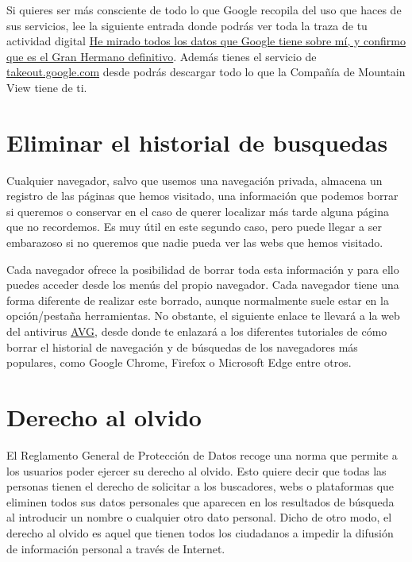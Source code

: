\documentclass[
  a4paper,
  openany]{book}
\begin{document}
Si quieres ser más consciente de todo lo que Google recopila del uso que haces de sus servicios, lee la siguiente entrada donde podrás ver toda la traza de tu actividad digital \href{https://www.xataka.com/privacidad/he-mirado-todos-datos-que-google-tiene-mi-confirmo-que-gran-hermano-definitivo-2}{He mirado todos los datos que Google tiene sobre mí, y confirmo que es el Gran Hermano definitivo}. Además tienes el servicio de \href{https://takeout.google.com}{takeout.google.com} desde podrás descargar todo lo que la Compañía de Mountain View tiene de ti.

\hypertarget{eliminar-el-historial-de-busquedas}{%
\section{Eliminar el historial de busquedas}\label{eliminar-el-historial-de-busquedas}}

Cualquier navegador, salvo que usemos una navegación privada, almacena un registro de las páginas que hemos visitado, una información que podemos borrar si queremos o conservar en el caso de querer localizar más tarde alguna página que no recordemos. Es muy útil en este segundo caso, pero puede llegar a ser embarazoso si no queremos que nadie pueda ver las webs que hemos visitado.

Cada navegador ofrece la posibilidad de borrar toda esta información y para ello puedes acceder desde los menús del propio navegador. Cada navegador tiene una forma diferente de realizar este borrado, aunque normalmente suele estar en la opción/pestaña herramientas. No obstante, el siguiente enlace te llevará a la web del antivirus \href{https://www.avg.com/es/signal/how-to-clear-your-browsing-and-search-history}{AVG}, desde donde te enlazará a los diferentes tutoriales de cómo borrar el historial de navegación y de búsquedas de los navegadores más populares, como Google Chrome, Firefox o Microsoft Edge entre otros.

\hypertarget{derecho-al-olvido}{%
\section{Derecho al olvido}\label{derecho-al-olvido}}

El Reglamento General de Protección de Datos recoge una norma que permite a los usuarios poder ejercer su derecho al olvido. Esto quiere decir que todas las personas tienen el derecho de solicitar a los buscadores, webs o plataformas que eliminen todos sus datos personales que aparecen en los resultados de búsqueda al introducir un nombre o cualquier otro dato personal. Dicho de otro modo, el derecho al olvido es aquel que tienen todos los ciudadanos a impedir la difusión de información personal a través de Internet.
\end{document}
